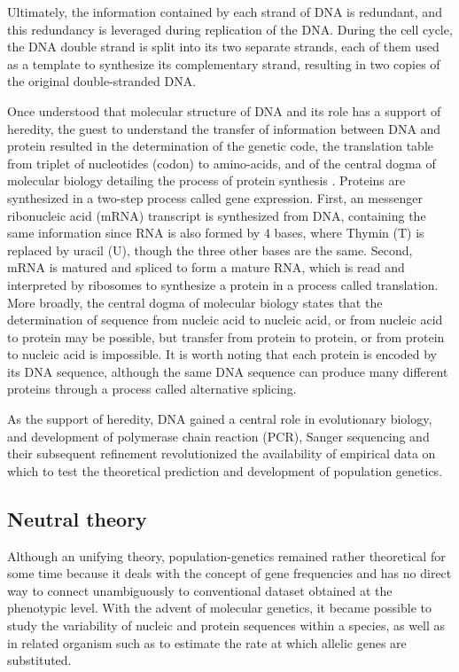 Ultimately, the information contained by each strand of \acrshort{DNA} is redundant, and this redundancy is leveraged during replication of the \acrshort{DNA}.
During the cell cycle, the \acrshort{DNA} double strand is split into its two separate strands, each of them used as a template to synthesize its complementary strand, resulting in two copies of the original double-stranded \acrshort{DNA}.

Once understood that molecular structure of \acrshort{DNA} and its role has a support of heredity, the guest to understand the transfer of information between \acrshort{DNA} and protein \cite{Crick1958} resulted in the determination of the genetic code, the translation table from triplet of nucleotides (\gls{codon}) to amino-acids, and of the central dogma of molecular biology detailing the process of protein synthesis \cite{Crick1970}.
Proteins are synthesized in a two-step process called gene expression.
First, an messenger ribonucleic acid (mRNA) transcript is synthesized from \acrshort{DNA}, containing the same information since \acrshort{RNA} is also formed by 4 bases, where Thymin (T) is replaced by uracil (U), though the three other bases are the same. 
Second, mRNA is matured and spliced to form a mature \acrshort{RNA}, which is read and interpreted by ribosomes to synthesize a protein in a process called translation. 
More broadly, the central dogma of molecular biology states that the determination of sequence from nucleic acid to nucleic acid, or from nucleic acid to protein may be possible, but transfer from protein to protein, or from protein to nucleic acid is impossible.
It is worth noting that each protein is encoded by its \acrshort{DNA} sequence, although the same \acrshort{DNA} sequence can produce many different proteins through a process called alternative splicing.

As the support of heredity, \acrshort{DNA} gained a central role in evolutionary biology, and development of polymerase chain reaction (PCR), Sanger sequencing and their subsequent refinement revolutionized the availability of empirical data on which to test the theoretical prediction and development of population genetics.

\subsection{Neutral theory}

Although an unifying theory, population-genetics remained rather theoretical for some time because it deals with the concept of gene frequencies and has no direct way to connect unambiguously to conventional dataset obtained at the phenotypic level.
With the advent of molecular genetics, it became possible to study the variability of nucleic and protein sequences within a species, as well as in related organism such as to estimate the rate at which allelic genes are substituted.

